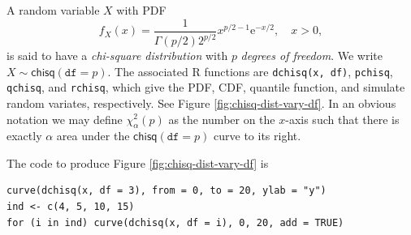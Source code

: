 \documentclass[captions=tableheading]{scrbook}
\begin{document}
A random variable \(X\) with PDF
\begin{equation}
f_{X}(x)=\frac{1}{\Gamma(p/2)2^{p/2}}x^{p/2-1}\mathrm{e}^{-x/2},\quad x>0,
\end{equation}
is said to have a \emph{chi-square distribution} with \(p\) \emph{degrees of freedom}. We write \(X\sim\mathsf{chisq}(\mathtt{df}=p)\). The associated \textsf{R} functions are \texttt{dchisq(x, df)}, \texttt{pchisq}, \texttt{qchisq}, and \texttt{rchisq}, which give the PDF, CDF, quantile function, and simulate random variates, respectively. See Figure \ref{fig:chisq-dist-vary-df}. In an obvious notation we may define \(\chi_{\alpha}^{2}(p)\) as the number on the \(x\)-axis such that there is exactly \(\alpha\) area under the \(\mathsf{chisq}(\mathtt{df}=p)\) curve to its right.

The code to produce Figure \ref{fig:chisq-dist-vary-df} is


\begin{verbatim}
curve(dchisq(x, df = 3), from = 0, to = 20, ylab = "y")
ind <- c(4, 5, 10, 15)
for (i in ind) curve(dchisq(x, df = i), 0, 20, add = TRUE)
\end{verbatim}
\end{document}
